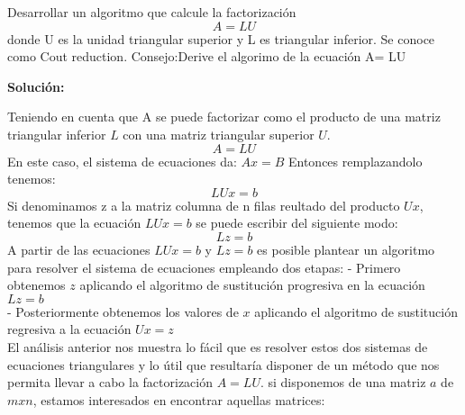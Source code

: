 Desarrollar un algoritmo que calcule la factorización
\[A=LU\]
donde U es la unidad triangular superior y L es triangular inferior. Se conoce como Cout reduction. Consejo:Derive el algorimo de la ecuación A= LU

\textbf{Solución:}

Teniendo en cuenta que A se puede factorizar como el producto de una matriz triangular inferior $L$ con una matriz triangular superior $U$.
\[A=LU\]
En este caso, el sistema de ecuaciones da: $Ax = B$
Entonces remplazandolo tenemos:
\[LUx=b\]
Si denominamos z a la matriz columna de n filas reultado del producto $Ux$, tenemos que la ecuación  $LUx=b$ se puede escribir del siguiente modo:
\[Lz = b\]
A partir de las ecuaciones $LUx = b$ y $Lz=b$ es posible plantear un algoritmo para resolver el sistema de ecuaciones empleando dos etapas:
- Primero obtenemos $z$ aplicando el algoritmo de sustitución progresiva en la ecuación $Lz=b$\\
- Posteriormente obtenemos los valores de $x$ aplicando el algoritmo de sustitución regresiva a la ecuación $Ux = z$\\
El análisis anterior nos muestra lo fácil que es resolver estos dos sistemas de ecuaciones triangulares y lo útil que resultaría disponer de un método que nos permita llevar a cabo la factorización $A= LU$. si disponemos de una matriz $a$ de $m x n$, estamos interesados en encontrar aquellas matrices:\\

